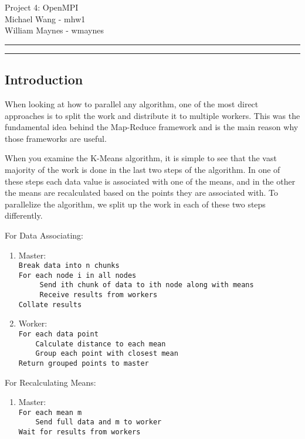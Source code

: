 \documentclass[11pt]{article}
\newcounter{questionCounter}
\newcounter{partCounter}[questionCounter]
\newenvironment{question}[2][\arabic{questionCounter}]{%
    \setcounter{partCounter}{0}%
    \vspace{.25in} \hrule \vspace{0.5em}%
        \noindent{\bf #2}%
    \vspace{0.8em} \hrule \vspace{.10in}%
    \addtocounter{questionCounter}{1}%
}{}
\newcommand{\myandrew}{William Maynes - wmaynes}
\newcommand{\partnerandrew}{Michael Wang - mhw1}
\newcommand{\myhwname}{Project 4: OpenMPI}
\begin{document}
\thispagestyle{plain}

{\Large \myhwname} \\
\partnerandrew \\
\myandrew \\

\begin{question}{Section 1 - Parallel Design} 
\subsection*{Introduction}
When looking at how to parallel any algorithm, one of the most direct approaches is to split the work and distribute it to multiple workers. This was the fundamental idea behind the Map-Reduce framework and is the main reason why those frameworks are useful. 

When you examine the K-Means algorithm, it is simple to see that the vast majority of the work is done in the last two steps of the algorithm. In one of these steps each data value is associated with one of the means, and in the other the means are recalculated based on the points they are associated with. To parallelize the algorithm, we split up the work in each of these two steps differently.

For Data Associating:
\begin{enumerate}[]
\item Master:\\
\verb$Break data into n chunks$\\
\verb$For each node i in all nodes$\\
\verb$     Send ith chunk of data to ith node along with means$\\
\verb$     Receive results from workers$\\
\verb$Collate results$

\item Worker:\\
\verb$For each data point$\\
\verb$    Calculate distance to each mean$\\
\verb$    Group each point with closest mean$\\
\verb$Return grouped points to master$\\
\end{enumerate}
For Recalculating Means:
\begin{enumerate}[]
\item Master:\\
\verb$For each mean m$\\
\verb$    Send full data and m to worker$\\
\verb$Wait for results from workers$\\


\end{enumerate}
\end{question}
\end{document}

